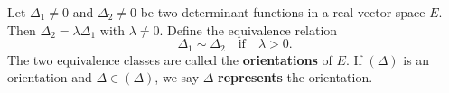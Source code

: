 Let $\Delta_1 \neq 0$ and $\Delta_2 \neq 0$ be two determinant functions in a real vector space $E$. Then $\Delta_2 = \lambda \Delta_1$ with $\lambda \neq 0$. Define the equivalence relation
$$\Delta_1 \sim \Delta_2 \quad \text{if} \quad \lambda > 0.$$
The two equivalence classes are called the \textbf{orientations} of $E$. If $(\Delta)$ is an orientation and $\Delta \in (\Delta)$, we say $\Delta$ \textbf{represents} the orientation.
